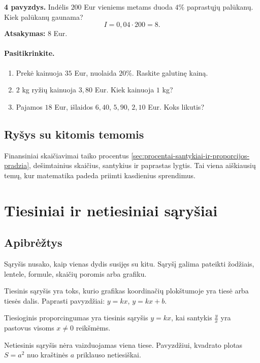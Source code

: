 \textbf{4 pavyzdys.} Indėlis \(200\) Eur vieniems metams duoda \(4\%\) paprastųjų palūkanų. Kiek palūkanų gaunama?
\[
I=0,04\cdot 200=8.
\]
\textbf{Atsakymas:} \(8\) Eur.

\paragraph{Pasitikrinkite.}
\begin{enumerate}[label=\arabic*.]
\item Prekė kainuoja \(35\) Eur, nuolaida \(20\%\). Raskite galutinę kainą.
\item \(2\) kg ryžių kainuoja \(3,80\) Eur. Kiek kainuoja \(1\) kg?
\item Pajamos \(18\) Eur, išlaidos \(6,40\), \(5,90\), \(2,10\) Eur. Koks likutis?
\end{enumerate}

\subsection{Ryšys su kitomis temomis}
Finansiniai skaičiavimai taiko procentus \ref{sec:procentai-santykiai-ir-proporcijos-pradzia}, dešimtainius skaičius, santykius ir paprastas lygtis. Tai viena aiškiausių temų, kur matematika padeda priimti kasdienius sprendimus.

\section{Tiesiniai ir netiesiniai sąryšiai}\label{sec:tiesiniai-ir-netiesiniai-sarysiai-5-6}

\subsection{Apibrėžtys}
\begin{apibreztis}
Sąryšis nusako, kaip vienas dydis susijęs su kitu. Sąryšį galima pateikti žodžiais, lentele, formule, skaičių poromis arba grafiku.
\end{apibreztis}
\begin{apibreztis}
Tiesinis sąryšis yra toks, kurio grafikas koordinačių plokštumoje yra tiesė arba tiesės dalis. Paprasti pavyzdžiai: \(y=kx\), \(y=kx+b\).
\end{apibreztis}
\begin{apibreztis}
Tiesioginis proporcingumas yra tiesinis sąryšis \(y=kx\), kai santykis \(\frac{y}{x}\) yra pastovus visoms \(x\ne 0\) reikšmėms.
\end{apibreztis}
\begin{apibreztis}
Netiesinis sąryšis nėra vaizduojamas viena tiese. Pavyzdžiui, kvadrato plotas \(S=a^2\) nuo kraštinės \(a\) priklauso netiesiškai.
\end{apibreztis}

